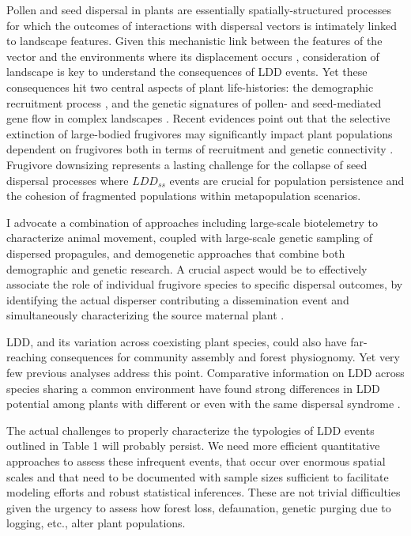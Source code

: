 \documentclass[a4paper, 12pt]{article}
\begin{document}
\begin{linenumbers}
Pollen and seed dispersal in plants are essentially spatially-structured processes for which the outcomes of interactions with dispersal vectors is intimately linked to landscape features. Given this mechanistic link between the features of the vector and the environments where its displacement occurs \citep{Nathan:2008fx}, consideration of landscape is key to understand the consequences of LDD events. Yet these consequences hit two central aspects of plant life-histories: the demographic recruitment process \citep{Harper:1977aa}, and the genetic signatures of pollen- and seed-mediated gene flow in complex landscapes \citep{Sork:1999}. Recent evidences point out that the selective extinction of large-bodied frugivores may significantly impact plant populations dependent on frugivores both in terms of recruitment \citep{Traveset:2012he,PerezMendez:2015hya} and genetic connectivity \citep{Perez-Mendez:2016dz}. Frugivore downsizing represents a lasting challenge for the collapse of seed dispersal processes where $LDD_{ss}$ events are crucial for population persistence and the cohesion of fragmented populations within metapopulation scenarios.

I advocate \citep[also see ][]{Jordano:2002tr,Nathan:2003qe,Jones:2008il,Hardesty:2011jn} a combination of approaches including large-scale biotelemetry to characterize animal movement, coupled with large-scale genetic sampling of dispersed propagules, and demogenetic approaches that combine both demographic and genetic research. A crucial aspect would be to effectively associate the role of individual frugivore species to specific dispersal outcomes, by identifying the actual disperser contributing a dissemination event \citep{GonzalezVaro:2014ij} and simultaneously characterizing the source maternal plant \citep{Jordano:2002tr}.

LDD, and its variation across coexisting plant species, could also have far-reaching consequences for community assembly and forest physiognomy. Yet very few previous analyses address this point. Comparative information on LDD across species sharing a common environment have found strong differences in LDD potential among plants with different \citep[e.g.,][]{Clark:1999sv,Martinez:2008jx} or even with the same dispersal syndrome \citep{Garcia:2016bd}.

The actual challenges to properly characterize the typologies of LDD events outlined in Table 1 will probably persist. We need more efficient quantitative approaches to assess these infrequent events, that occur over enormous spatial scales and that need to be documented with sample sizes sufficient to facilitate modeling efforts and robust statistical inferences. These are not trivial difficulties given the urgency to assess how forest loss, defaunation, genetic purging due to logging, etc., alter plant populations. 





\end{linenumbers}
\end{document}
